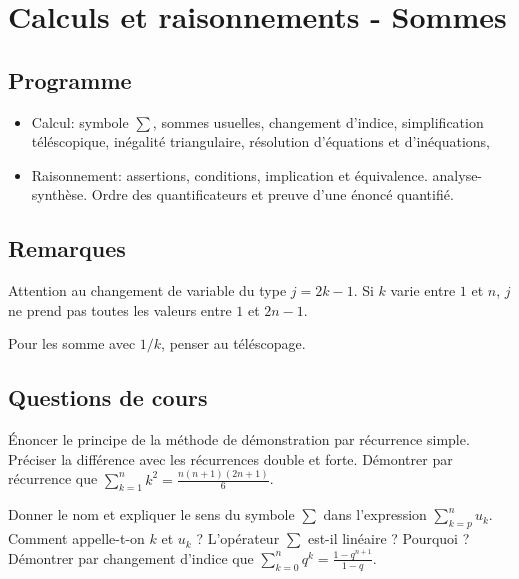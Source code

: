  \chapter{Calculs et raisonnements - Sommes}
 
\section{Programme}
	\begin{itemize}
 	\item Calcul: symbole $\sum$, sommes usuelles, changement d'indice, simplification téléscopique, inégalité triangulaire, résolution d’équations et d’inéquations,
 	\item Raisonnement: assertions, conditions, implication et équivalence.  analyse-synthèse. Ordre des  quantificateurs et preuve d’une énoncé quantifié.
 \end{itemize}


\section{Remarques}


\NB Attention au changement de variable du type $j=2k-1$. Si $k$ varie entre $1$ et $n$, $j$ ne prend pas toutes les valeurs entre $1$ et $2n-1$. 

\NB Pour les somme avec $1/k$, penser au téléscopage. 
 

\section{Questions de cours}	


\begin{exercise}[subtitle=Récurrences, extype=cours]
	\begin{tasks}
		\task Énoncer le principe de la méthode de démonstration par récurrence simple.
		\task Préciser la différence avec les récurrences double et forte.
		\task Démontrer par récurrence que $\sum\limits_{k=1}^n k^2 = \frac{n(n+1)(2n+1)}{6}$.
	\end{tasks}
\end{exercise}

\begin{exercise}[subtitle=Symbole $\sum$, extype=cours]
\begin{tasks}
	\task Donner le nom et expliquer le sens du symbole $\sum$ dans l'expression  $\sum\limits_{k=p}^n u_k$. 
	\task Comment appelle-t-on $k$ et $u_k$ ? 
	\task L'opérateur $\sum$ est-il linéaire ? Pourquoi ?  
    \task Démontrer par changement d'indice que $ \sum\limits_{k=0}^n q^k = \frac{1 - q^{n+1}}{1-q}$. 
\end{tasks}
\end{exercise}


